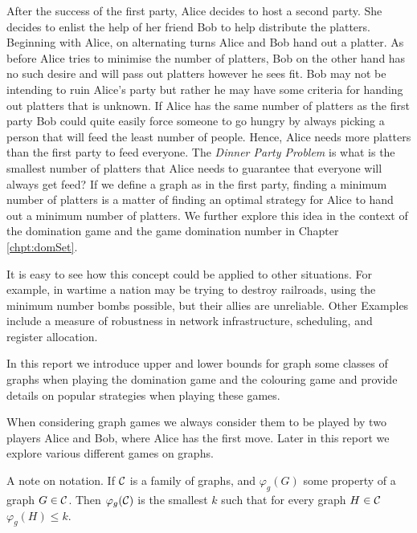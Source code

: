 After the success of the first party, Alice decides to host a second party. She decides to enlist the help of her friend Bob to help distribute the platters. Beginning with Alice, on alternating turns Alice and Bob hand out a platter. As before Alice tries to minimise the number of platters, Bob on the other hand has no such desire and will pass out platters however he sees fit. Bob may not be intending to ruin Alice's party but rather he may have some criteria for handing out platters that is unknown. If Alice has the same number of platters as the first party Bob could quite easily force someone to go hungry by always picking a person that will feed the least number of people. Hence, Alice needs more platters than the first party to feed everyone. The \textit{Dinner Party Problem} is what is the smallest number of platters that Alice needs to guarantee that everyone will always get feed? If we define a graph as in the first party, finding a minimum number of platters is a matter of finding an optimal strategy for Alice to hand out a minimum number of platters. We further explore this idea in the context of the domination game and the game domination number in Chapter \ref{chpt:domSet}.

It is easy to see how this concept could be applied to other situations. For example, in wartime a nation may be trying to destroy railroads, using the minimum number bombs possible, but their allies are unreliable. Other Examples include a measure of robustness in network infrastructure, scheduling, and register allocation.  

In this report %
we introduce upper and lower bounds for graph some classes of graphs when playing the domination game and the colouring game and provide details on popular strategies when playing these games.

When considering graph games we always consider them to be played by two players Alice and Bob, where Alice has the first move. Later in this report we explore various different games on graphs.    




  
    
A note on notation. If $\mathcal{C}$ is a family of graphs, and $\varphi_g(G)$ some property of a graph $G \in \mathcal{C}$. Then $\varphi_g(\mathcal{C})$ is the smallest $k$ such that for every graph $H\in\mathcal{C}$ $\varphi_g(H)\leq k$.   

    
    
    
    
    
    
    
    
    
    
    
    
    
    
    
    
    
    
    
    
    